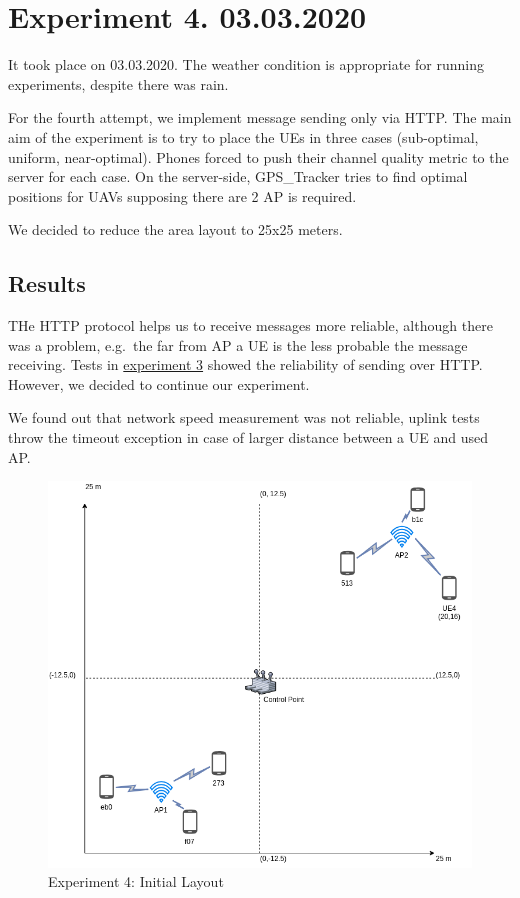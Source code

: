 \hypertarget{experiment-4.-03.03.2020}{%
\section{Experiment 4. 03.03.2020}\label{experiment-4.-03.03.2020}}

It took place on 03.03.2020. The weather condition is appropriate for
running experiments, despite there was rain.

For the fourth attempt, we implement message sending only via HTTP. The
main aim of the experiment is to try to place the UEs in three cases
(sub-optimal, uniform, near-optimal). Phones forced to push their
channel quality metric to the server for each case. On the server-side,
GPS\_Tracker tries to find optimal positions for UAVs supposing there
are 2 AP is required.

We decided to reduce the area layout to 25x25 meters.

\hypertarget{results}{%
\subsection{Results}\label{results}}

THe HTTP protocol helps us to receive messages more reliable, although
there was a problem, e.g.~the far from AP a UE is the less probable the
message receiving. Tests in \href{06-attempt-03.md}{experiment 3} showed
the reliability of sending over HTTP. However, we decided to continue
our experiment.

We found out that network speed measurement was not reliable, uplink
tests throw the timeout exception in case of larger distance between a
UE and used AP.

\begin{figure}[H]
	\centering
	\includegraphics[width=\linewidth,keepaspectratio]{images/05-cases-description-Exp-4-Initial-Layout.png}
\caption{Experiment 4: Initial Layout}
\end{figure}

